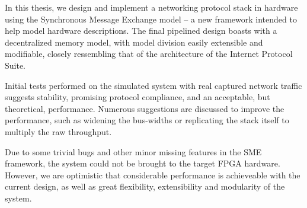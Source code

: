 In this thesis, we design and implement a networking protocol stack in hardware
using the Synchronous Message Exchange model -- a new framework intended to
help model hardware descriptions.  The final pipelined design boasts with
a decentralized memory model, with model division easily extensible and
modifiable, closely ressembling that of the architecture of the Internet
Protocol Suite.

Initial tests performed on the simulated system with real captured network
traffic suggests stability, promising protocol compliance, and an acceptable, but
theoretical, performance. Numerous suggestions are discussed to improve the performance,
such as widening the bus-widths or replicating the stack itself to multiply the
raw throughput.

Due to some trivial bugs and other minor missing features in the SME framework,
the system could not be brought to the target FPGA hardware. However, we are
optimistic that considerable performance is achieveable with the current design,
as well as great flexibility, extensibility and modularity of the system.


